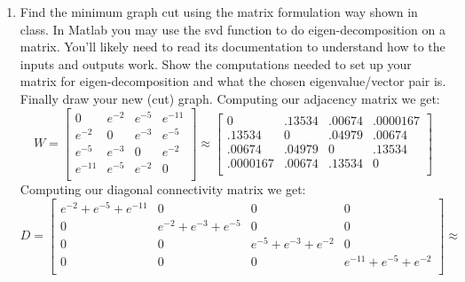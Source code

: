 \documentclass{article}
\begin{document}
\begin{enumerate}
\begin{enumerate}
\newline

\item Find the minimum graph cut using the matrix formulation way shown in class.
In Matlab you may use the svd function to do eigen-decomposition on a matrix.
You’ll likely need to read its documentation to understand how to the inputs and outputs work.
Show the computations needed to set up your matrix for eigen-decomposition and what the chosen eigenvalue/vector pair is.
Finally draw your new (cut) graph.
\newline
\newline
Computing our adjacency matrix we get:
$$W = \begin{bmatrix}
0       & e^{-2} & e^{-5} & e^{-11} \\
e^{-2}  & 0      & e^{-3} & e^{-5}  \\
e^{-5}  & e^{-3} & 0      & e^{-2}  \\
e^{-11} & e^{-5} & e^{-2} & 0       \\
\end{bmatrix} \approx
\begin{bmatrix}
0       & .13534 & .00674 & .0000167\\
.13534  & 0      & .04979 & .00674  \\
.00674  & .04979 & 0      & .13534  \\
.0000167& .00674 & .13534 & 0       \\
\end{bmatrix}
$$
\newline
Computing our diagonal connectivity matrix we get:
$$D = \begin{bmatrix}
e^{-2} + e^{-5} + e^{-11} & 0 & 0 & 0 \\
0 & e^{-2}  + e^{-3} + e^{-5} & 0 & 0 \\
0 & 0 & e^{-5} + e^{-3} + e^{-2}  & 0 \\
0 & 0 & 0 & e^{-11} + e^{-5} + e^{-2} \\
\end{bmatrix} \approx $$

\end{enumerate}
\end{enumerate}
\end{document}
